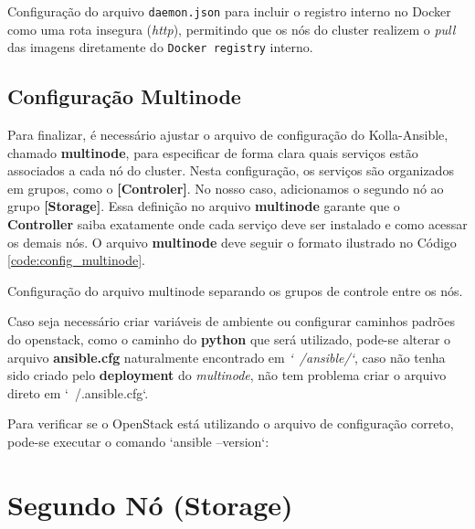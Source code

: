 \begin{listing}[h!]
    \noindent{}  
  \caption{Configuração do arquivo \texttt{daemon.json} para incluir o registro interno no Docker como uma rota insegura (\textit{http}), permitindo que os nós do cluster realizem o \textit{pull} das imagens diretamente do \texttt{Docker registry} interno.}
  \label{code:docker_insecure_registry}
\end{listing}


\subsection{Configuração Multinode}
Para finalizar, é necessário ajustar o arquivo de configuração do Kolla-Ansible, chamado \textbf{multinode}, para especificar de forma clara quais serviços estão associados a cada nó do cluster. Nesta configuração, os serviços são organizados em grupos, como o \textbf{[Controler]}. No nosso caso, adicionamos o segundo nó ao grupo \textbf{[Storage]}. Essa definição no arquivo \textbf{multinode} garante que o \textbf{Controller} saiba exatamente onde cada serviço deve ser instalado e como acessar os demais nós. O arquivo \textbf{multinode} deve seguir o formato ilustrado no Código \ref{code:config_multinode}.

\begin{listing}[h!]
    \noindent{}  
  \caption{Configuração do arquivo multinode separando os grupos de controle entre os nós.}
  \label{code:config_multinode}
\end{listing}

Caso seja necessário criar variáveis de ambiente ou configurar caminhos padrões do openstack, como o caminho do \textbf{python} que será utilizado, pode-se alterar o arquivo \textbf{ansible.cfg} naturalmente encontrado em \textit{`~/ansible/`}, caso não tenha sido criado pelo \textbf{deployment} do \textit{multinode}, não tem problema criar o arquivo direto em `~/.ansible.cfg`. 

Para verificar se o OpenStack está utilizando o arquivo de configuração correto, pode-se executar o comando `ansible --version`:

\section{Segundo Nó (Storage)}

